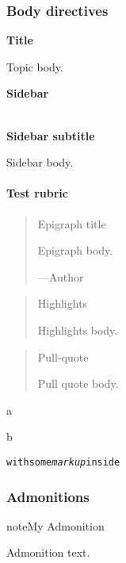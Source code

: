 \documentclass[letterpaper,10pt,english]{sphinxhowto}
\begin{document}
\subsubsection{Body directives}
\label{markup:body-directives}
\begin{SphinxShadowBox}
\textbf{Title}

\medskip


Topic body.
\end{SphinxShadowBox}

\begin{SphinxShadowBox}
\textbf{Sidebar}

\medskip

~\\
\textbf{Sidebar subtitle}
\smallskip

Sidebar body.
\end{SphinxShadowBox}
\paragraph{Test rubric}
\begin{quote}

Epigraph title

Epigraph body.

\begin{flushright}
---Author
\end{flushright}
\end{quote}
\begin{quote}

Highlights

Highlights body.
\end{quote}
\begin{quote}

Pull-quote

Pull quote body.
\end{quote}

a

b
\begin{alltt}
with some \emph{markup} inside
\end{alltt}


\subsubsection{Admonitions}
\label{markup:admonitions}\label{markup:admonition-section}
\begin{notice}{note}{My Admonition}

Admonition text.
\end{notice}
\end{document}
